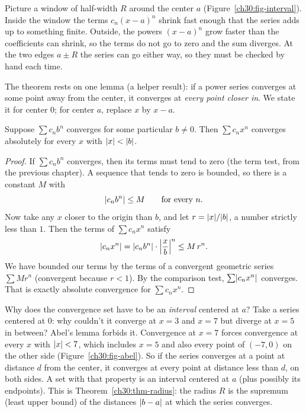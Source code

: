 \begin{intuitionbox}
Picture a window of half-width $R$ around the center $a$ (Figure~\ref{ch30:fig-interval}). Inside the window the terms $c_n(x-a)^n$ shrink fast enough that the series adds up to something finite. Outside, the powers $(x-a)^n$ grow faster than the coefficients can shrink, so the terms do not go to zero and the sum diverges. At the two edges $a \pm R$ the series can go either way, so they must be checked by hand each time.
\end{intuitionbox}

The theorem rests on one lemma (a helper result): if a power series converges at some point away from the center, it converges at \emph{every point closer in}. We state it for center $0$; for center $a$, replace $x$ by $x-a$.

\begin{lemma}
\label{ch30:lem-abel}
Suppose $\sum c_n b^n$ converges for some particular $b \neq 0$. Then $\sum c_n x^n$ converges absolutely for every $x$ with $\lvert x\rvert < \lvert b\rvert$.
\end{lemma}

\begin{proof}
If $\sum c_n b^n$ converges, then its terms must tend to zero (the term test, from the previous chapter). A sequence that tends to zero is bounded, so there is a constant $M$ with
\[
  \lvert c_n b^n\rvert \le M \qquad \text{for every } n.
\]
Now take any $x$ closer to the origin than $b$, and let $r = \lvert x\rvert/\lvert b\rvert$, a number strictly less than $1$. Then the terms of $\sum c_n x^n$ satisfy
\[
  \lvert c_n x^n\rvert
  = \lvert c_n b^n\rvert\cdot \left|\frac{x}{b}\right|^n
  \le M \, r^n.
\]
We have bounded our terms by the terms of a convergent geometric series $\sum M r^n$ (convergent because $r<1$). By the comparison test, $\sum \lvert c_n x^n\rvert$ converges. That is exactly absolute convergence for $\sum c_n x^n$.
\end{proof}

\begin{whybox}
Why does the convergence set have to be an \emph{interval} centered at $a$? Take a series centered at $0$: why couldn't it converge at $x=3$ and $x=7$ but diverge at $x=5$ in between? Abel's lemma forbids it. Convergence at $x=7$ forces convergence at every $x$ with $\lvert x\rvert < 7$, which includes $x=5$ and also every point of $(-7,0)$ on the other side (Figure~\ref{ch30:fig-abel}). So if the series converges at a point at distance $d$ from the center, it converges at every point at distance less than $d$, on both sides. A set with that property is an interval centered at $a$ (plus possibly its endpoints). This is Theorem~\ref{ch30:thm-radius}: the radius $R$ is the supremum (least upper bound) of the distances $\lvert b-a\rvert$ at which the series converges.
\end{whybox}

